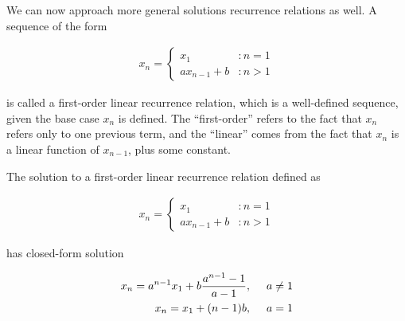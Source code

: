We can now approach more general solutions recurrence relations as well. A sequence of the form

\begin{align*}
	x_n =
	\begin{cases}
		x_1 &: n = 1 \\
		a x_{n - 1} + b &: n > 1
	\end{cases}
\end{align*}

is called a first-order linear recurrence relation, which is a well-defined sequence, given the base case $x_n$ is defined. The ``first-order'' refers to the fact that $x_n$ refers only to one previous term, and the ``linear'' comes from the fact that $x_n$ is a linear function of $x_{n - 1}$, plus some constant.

\vspace{\baselineskip}
\begin{theorem}
	The solution to a first-order linear recurrence relation defined as
	
	\begin{align*}
		x_n =
		\begin{cases}
			x_1 &: n = 1 \\
			a x_{n - 1} + b &: n > 1
		\end{cases}
	\end{align*}
	
	has closed-form solution
	
	\begin{align*}
		x_n = a^{n - 1} x_1 + b \frac{a^{n - 1} - 1}{a - 1}, & \hspace{\baselineskip} a \neq 1 \\
		x_n = x_1 + (n - 1)b, &\hspace{\baselineskip} a =  1
	\end{align*}
\end{theorem}
